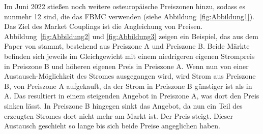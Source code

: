 Im Juni 2022 stießen noch weitere osteuropäische Preiszonen hinzu, sodass es nunmehr 12 sind, die das FBMC verwenden (siehe Abbildung~\ref{fig:Abbildung1}).\\
Das Ziel des Market Couplings ist die Angleichung von Preisen. Abbildung~\ref{fig:Abbildung2} und \ref{fig:Abbildung3} zeigen ein Beispiel, das aus dem Paper von \cite{3} stammt, bestehend aus Preiszone A und Preiszone B. Beide Märkte befinden sich jeweils im Gleichgewicht mit einem niedrigeren eigenen Strompreis in Preiszone B und höheren eigenen Preis in Preiszone A. Wenn nun von einer Austausch-Möglichkeit des Stromes ausgegangen wird, wird Strom aus Preiszone B, von Preiszone A aufgekauft, da der Strom in Preiszone B günstiger ist als in A. Das resultiert in einem steigenden Angebot in Preiszone A, was dort den Preis sinken lässt. In Preiszone B hingegen sinkt das Angebot, da nun ein Teil des erzeugten Stromes dort nicht mehr am Markt ist. Der Preis steigt. Dieser Austausch geschieht so lange bis sich beide Preise angeglichen haben. 

